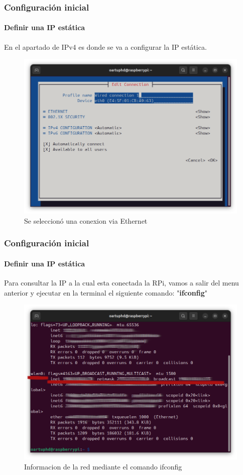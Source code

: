 \documentclass{beamer}
\begin{document}
	\begin{frame}
		\frametitle{Configuración inicial}
		\framesubtitle{Definir una IP estática}
		En el apartado de IPv4 es donde se va a configurar la IP estática.
		\begin{figure}
			\includegraphics[scale=0.25]{rpissh3.png}
			\caption{Se seleccionó una conexion via Ethernet}
		\end{figure}
	\end{frame}
	\begin{frame}
		\frametitle{Configuración inicial}
		\framesubtitle{Definir una IP estática}
		Para consultar la IP a la cual esta conectada la RPi, vamos a salir del menu anterior y ejecutar en la terminal el siguiente comando: "\textbf{ifconfig}"
		
		\begin{figure}
			\includegraphics[scale=0.25]{rpissh5.png}
			\caption{Informacion de la red mediante el comando ifconfig}
		\end{figure}
		
	\end{frame}
\end{document}
